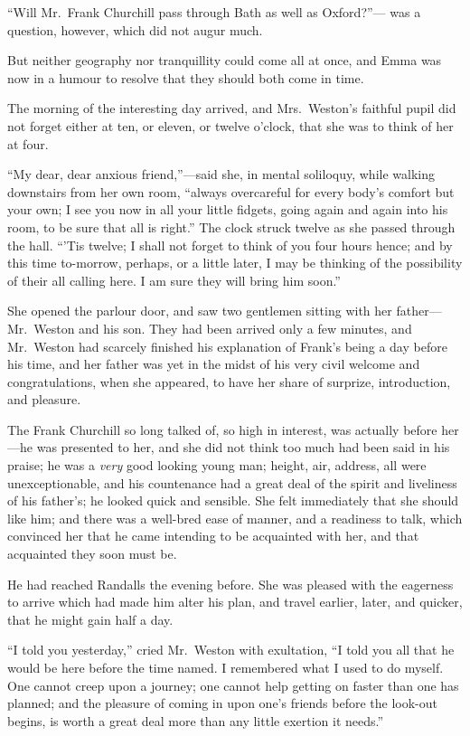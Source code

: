 ``Will Mr.\ Frank Churchill pass through Bath as well as Oxford?''---%
was a question, however, which did not augur much.

But neither geography nor tranquillity could come all at once,
and Emma was now in a humour to resolve that they should both come
in time.

The morning of the interesting day arrived, and Mrs.\ Weston's
faithful pupil did not forget either at ten, or eleven, or twelve
o'clock, that she was to think of her at four.

``My dear, dear anxious friend,''---said she, in mental soliloquy,
while walking downstairs from her own room, ``always overcareful
for every body's comfort but your own; I see you now in all your
little fidgets, going again and again into his room, to be sure
that all is right.''  The clock struck twelve as she passed through
the hall.  ``'Tis twelve; I shall not forget to think of you four
hours hence; and by this time to-morrow, perhaps, or a little later,
I may be thinking of the possibility of their all calling here.
I am sure they will bring him soon.''

She opened the parlour door, and saw two gentlemen sitting with
her father---Mr.\ Weston and his son.  They had been arrived only
a few minutes, and Mr.\ Weston had scarcely finished his explanation
of Frank's being a day before his time, and her father was yet
in the midst of his very civil welcome and congratulations, when
she appeared, to have her share of surprize, introduction, and pleasure.

The Frank Churchill so long talked of, so high in interest,
was actually before her---he was presented to her, and she did
not think too much had been said in his praise; he was a \emph{very} good
looking young man; height, air, address, all were unexceptionable,
and his countenance had a great deal of the spirit and liveliness
of his father's; he looked quick and sensible.  She felt immediately
that she should like him; and there was a well-bred ease of manner,
and a readiness to talk, which convinced her that he came intending
to be acquainted with her, and that acquainted they soon must be.

He had reached Randalls the evening before.  She was pleased
with the eagerness to arrive which had made him alter his plan,
and travel earlier, later, and quicker, that he might gain half
a day.

``I told you yesterday,'' cried Mr.\ Weston with exultation, ``I told
you all that he would be here before the time named.  I remembered
what I used to do myself.  One cannot creep upon a journey;
one cannot help getting on faster than one has planned; and the
pleasure of coming in upon one's friends before the look-out begins,
is worth a great deal more than any little exertion it needs.''

